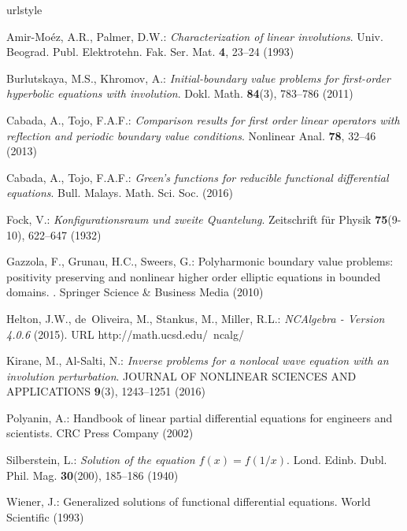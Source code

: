 \documentclass[a4paper,12pt,onecolumn]{article}
\theoremstyle{ptheorem}
\theoremstyle{hdef}
\theoremstyle{premark}
\numberwithin{equation}{section}
\numberwithin{figure}{section}
\newcommand{\<}{\langle}
\renewcommand{\>}{\rangle}
\renewcommand{\<}{\left<}
\renewcommand{\>}{\right>}
\renewcommand{\(}{\left(}
\renewcommand{\)}{\right)}
\begin{document}
\begin{thebibliography}{10}
\providecommand{\url}[1]{{#1}}
\providecommand{\urlprefix}{URL }
\expandafter\ifx\csname urlstyle\endcsname\relax
  \providecommand{\doi}[1]{DOI~\discretionary{}{}{}#1}\else
  \providecommand{\doi}{DOI~\discretionary{}{}{}\begingroup
  \urlstyle{rm}\Url}\fi

Amir-Mo{\'e}z, A.R., Palmer, D.W.: \emph{Characterization of linear
  involutions}.
\newblock Univ. Beograd. Publ. Elektrotehn. Fak. Ser. Mat. \textbf{4}, 23--24
  (1993)

Burlutskaya, M.S., Khromov, A.: \emph{Initial-boundary value problems for
  first-order hyperbolic equations with involution}.
\newblock Dokl. Math. \textbf{84}(3), 783--786 (2011)

Cabada, A., Tojo, F.A.F.: \emph{Comparison results for first order linear
  operators with reflection and periodic boundary value conditions}.
\newblock Nonlinear Anal. \textbf{78}, 32--46 (2013)

Cabada, A., Tojo, F.A.F.: \emph{{Green's} functions for reducible functional
  differential equations}.
\newblock Bull. Malays. Math. Sci. Soc.  (2016)

Fock, V.: \emph{Konfigurationsraum und zweite Quantelung}.
\newblock Zeitschrift f{\"u}r Physik \textbf{75}(9-10), 622--647 (1932)

Gazzola, F., Grunau, H.C., Sweers, G.: Polyharmonic boundary value problems:
  positivity preserving and nonlinear higher order elliptic equations in
  bounded domains.
. Springer Science \& Business Media (2010)

Helton, J.W., de~Oliveira, M., Stankus, M., Miller, R.L.: \emph{NCAlgebra -
  Version 4.0.6} (2015).
\newblock \urlprefix\url{http://math.ucsd.edu/~ncalg/}

Kirane, M., Al-Salti, N.: \emph{Inverse problems for a nonlocal wave equation
  with an involution perturbation}.
\newblock JOURNAL OF NONLINEAR SCIENCES AND APPLICATIONS \textbf{9}(3),
  1243--1251 (2016)

Polyanin, A.: Handbook of linear partial differential equations for engineers
  and scientists.
\newblock CRC Press Company (2002)

Silberstein, L.: \emph{Solution of the equation $f (x)= f (1/x)$}.
\newblock Lond. Edinb. Dubl. Phil. Mag. \textbf{30}(200), 185--186 (1940)

Wiener, J.: Generalized solutions of functional differential equations.
\newblock World Scientific (1993)

\end{thebibliography}
\end{document}
